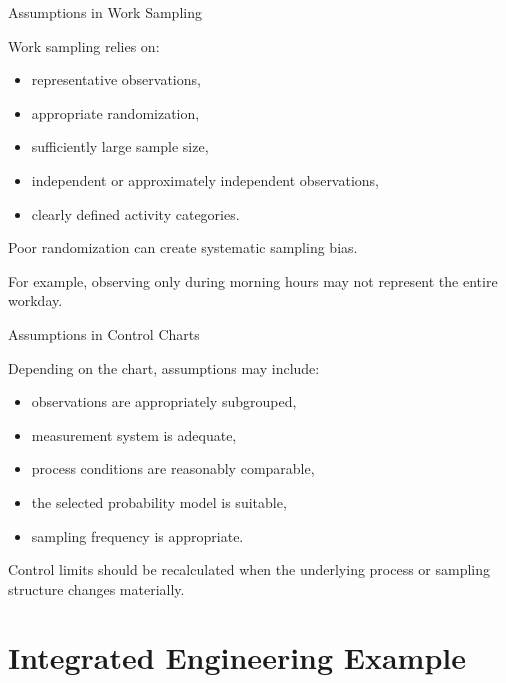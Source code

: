 \documentclass[aspectratio=169,10pt]{beamer}
\begin{document}

\begin{frame}[shrink=18]{Assumptions in Work Sampling}
\small

Work sampling relies on:

\begin{itemize}
    \item representative observations,
    \item appropriate randomization,
    \item sufficiently large sample size,
    \item independent or approximately independent observations,
    \item clearly defined activity categories.
\end{itemize}

Poor randomization can create systematic sampling bias.

For example, observing only during morning hours may not represent
the entire workday.

\end{frame}


\begin{frame}[shrink=18]{Assumptions in Control Charts}
\small

Depending on the chart, assumptions may include:

\begin{itemize}
    \item observations are appropriately subgrouped,
    \item measurement system is adequate,
    \item process conditions are reasonably comparable,
    \item the selected probability model is suitable,
    \item sampling frequency is appropriate.
\end{itemize}

Control limits should be recalculated when the underlying process
or sampling structure changes materially.

\end{frame}


\section{Integrated Engineering Example}
\end{document}
